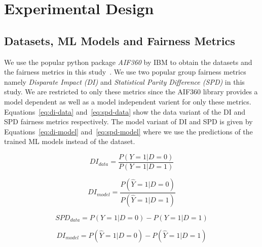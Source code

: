 \documentclass{article}
\begin{document}




\section{Experimental Design}\label{sec:method}

\subsection{Datasets, ML Models and Fairness Metrics}\label{sec:method-parameters}

We use the popular python package \emph{AIF360} by IBM to obtain the
datasets and the fairness metrics in this study \cite{aif360}. We use
two popular group fairness metrics namely \emph{Disparate Impact (DI)}
and \emph{Statistical Parity Difference (SPD)} in this study. We are
restricted to only these metrics since the AIF360 library provides a
model dependent as well as a model independent varient for only these
metrics. Equations \ref{eq:di-data} and \ref{eq:spd-data} show the
data variant of the DI and SPD fairness metrics respectively. The
model variant of DI and SPD is given by Equations \ref{eq:di-model}
and \ref{eq:spd-model} where we use the predictions of the trained ML
models instead of the dataset.

\begin{equation}
  DI_{data} = \frac{P(Y=1|D=0)}{P(Y=1|D=1)}
  \label{eq:di-data}
\end{equation}

\begin{equation}
  DI_{model} = \frac{P(\hat{Y}=1|D=0)}{P(\hat{Y}=1|D=1)}
  \label{eq:di-model}
\end{equation}

\begin{equation}
  SPD_{data} = P(Y=1|D=0)-P(Y=1|D=1)
  \label{eq:spd-data}
\end{equation}

\begin{equation}
  DI_{model} = P(\hat{Y}=1|D=0)-P(\hat{Y}=1|D=1)
  \label{eq:spd-model}
\end{equation}
\end{document}
